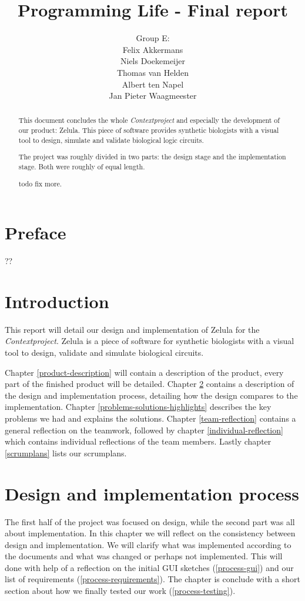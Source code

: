 \documentclass[a4paper]{article}
\title{Programming Life - Final report}
\author{Group E:\\
Felix Akkermans \\
Niels Doekemeijer \\
Thomas van Helden \\
Albert ten Napel \\
Jan Pieter Waagmeester}
\begin{document}
\maketitle
\thispagestyle{empty}
\vfill

\small{\tableofcontents}
\pagebreak{}

\section*{Preface} ??


\pagebreak
\begin{abstract}
\noindent This document concludes the whole \textit{Contextproject} and especially the development of our product: Zelula. This piece of software provides synthetic biologists with a visual tool to design, simulate and validate biological logic circuits.

The project was roughly divided in two parts: the design stage and the implementation stage. Both were roughly of equal length.

todo fix more.
\end{abstract}
\pagebreak

\section{Introduction}
This report will detail our design and implementation of Zelula for the \textit{Contextproject}. Zelula is a piece of software for synthetic biologists with a visual tool to design, validate and simulate biological circuits.

Chapter \ref{product-description} will contain a description of the product, every part of the finished product will be detailed. Chapter \ref{design-implementation} contains a description of the design and implementation process, detailing how the design compares to the implementation. Chapter \ref{problems-solutions-highlights} describes the key problems we had and explains the solutions. Chapter \ref{team-reflection} contains a general reflection on the teamwork, followed by chapter \ref{individual-reflection} which contains individual reflections of the team members. Lastly chapter \ref{scrumplans} lists our scrumplans.



\section{Design and implementation process}
\label{design-implementation}
The first half of the project was focused on design, while the second part was all about implementation. In this chapter we will reflect on the consistency between design and implementation. We will clarify what was implemented according to the documents and what was changed or perhaps not implemented. This will done with help of a reflection on the initial GUI sketches (\ref{process-gui}) and our list of requirements (\ref{process-requirements}).
The chapter is conclude with a short section about how we finally tested our work (\ref{process-testing}).
\end{document}
